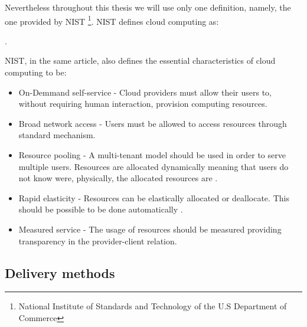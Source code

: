         Nevertheless throughout this thesis we will use only one definition, namely, the one provided by NIST \footnote{National Institute of Standards and Technology of the U.S Department of Commerce}. NIST defines cloud computing as: 
        
        . 
        
        NIST, in the same article, also defines the essential characteristics of cloud computing to be:
        \begin{itemize}
			\item{On-Demmand self-service} - Cloud providers must allow their users to, without requiring human interaction, provision computing resources.
            \item{Broad network access} - Users must be allowed to access resources through standard mechanism. 
            \item{Resource pooling} - A multi-tenant model should be used in order to serve multiple users. Resources are allocated dynamically meaning that users do not know were, physically, the allocated resources are \cite{Garrison2012}.
            
            \item{Rapid elasticity} - Resources can be elastically allocated or deallocate. This should be possible to be done automatically \cite{Garrison2012,Mell2011}.
            
            \item{Measured service} - The usage of resources should be measured providing transparency in the provider-client relation.

		\end{itemize}
        
        \subsection{Delivery methods}
        
